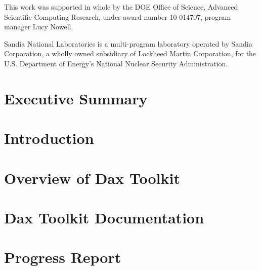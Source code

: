 \documentclass[12pt,report]{SANDreport}
\begin{document}
This work was supported in whole by the DOE Office of Science, Advanced
Scientific Computing Research, under award number 10-014707, program
manager Lucy Nowell.

Sandia National Laboratories is a multi-program laboratory operated by
Sandia Corporation, a wholly owned subsidiary of Lockheed Martin
Corporation, for the U.S. Department of Energy's National Nuclear Security
Administration.


\cleardoublepage %
\tableofcontents
\listoffigures
\lstlistoflistings

\clearpage

\chapter*{Executive Summary}



\SANDmain %

\chapter{Introduction}
\label{chap:Introduction}



\chapter{Overview of Dax Toolkit}
\label{chap:Overview}



\chapter{Dax Toolkit Documentation}
\label{chap:Documentation}



\chapter{Progress Report}
\label{chap:ProgressReport}



\clearpage

\providecommand*{\phantomsection}{}
\phantomsection
{}



\begin{flushleft}
  \clearpage
  \lhead[]{}
  \rhead[]{}
  \phantomsection
  \printindex
\end{flushleft}


\end{document}
